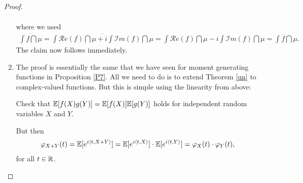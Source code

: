 \begin{proof}[Proof]
\begin{enumerate}[label=(\roman*)]
\begin{align*}
			\end{align*}
			where we used
			\begin{align*}
				\overline{\int f\dint \mu}=\overline{\int \mathcal{R}e(f)\dint \mu+i\int \mathcal{I}m(f)\dint \mu}=\int \mathcal{R}e(f)\dint \mu-i\int \mathcal{I}m(f)\dint \mu=\int \overline{f}\dint \mu.
			\end{align*}
			The claim now follows immediately.
			\item The proof is essentially the same that we have seen for moment generating functions in Proposition \ref{P7}. All we need to do is to extend Theorem \ref{un} to complex-valued functions. But this is simple using the linearity from above:
			\begin{luebung}
				Check that $\mathbb{E}[f(X)g(Y)]=\mathbb{E}[f(X)]\mathbb{E}[g(Y)]$ holds for independent random variables $X$ and $Y$.
			\end{luebung}
		But then 
		\begin{align*}
			\varphi_{X+Y}(t)=\mathbb{E}[e^{i\langle t,X+Y\rangle}]=\mathbb{E}[e^{i\langle t,X\rangle}]\cdot \mathbb{E}[e^{i\langle t,Y\rangle}]=\varphi_X(t)\cdot \varphi_Y(t),
		\end{align*}
		for all $t\in\mathbb{R}$.
	\end{enumerate}
\end{proof}
	\marginpar{\textcolor{red}{Lecture 16}}

